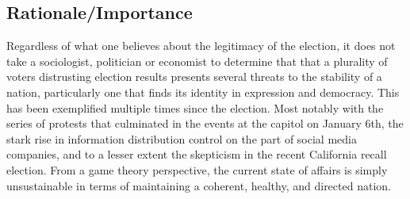 \documentclass{article}
\begin{document}
\subsection{Rationale/Importance}
\smallbreak \noindent
Regardless of what one believes about the legitimacy of the election, it does not take a sociologist, politician or economist to determine that that a plurality of voters distrusting election results presents several threats to the stability of a nation, particularly one that finds its identity in expression and democracy. This has been exemplified multiple times since the election. Most notably with the series of protests that culminated in the events at the capitol on January 6th, the stark rise in information distribution control on the part of social media companies, and to a lesser extent the skepticism in the recent California recall election. From a game theory perspective, the current state of affairs is simply unsustainable in terms of maintaining a coherent, healthy, and directed nation.
\end{document}
